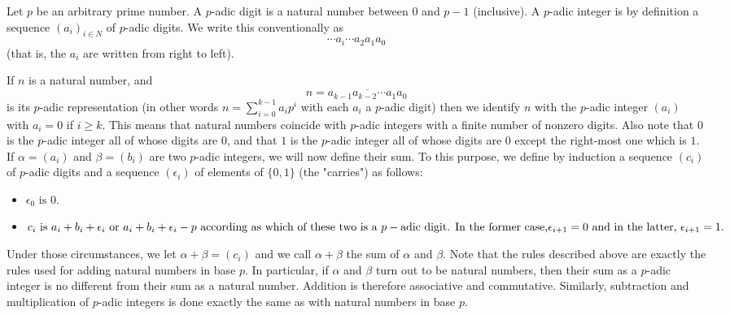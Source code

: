 \documentclass{llncs}
\begin{document}
Let $p$ be an arbitrary prime number. A $p$-adic digit is a natural number between $0$ and $p-1$ (inclusive). A $p$-adic integer is by definition a sequence $(a_i)_{i \in N}$ of $p$-adic digits. We write this conventionally as
$$
\cdots a_i \cdots  a_2 a_1 a_0
$$
(that is, the $a_i$ are written from right to left).

If $n$ is a natural number, and
$$
n = \overline{a_{k-1} a_{k-2} \cdots  a_1 a_0}
$$
is its $p$-adic representation (in other words $n = \sum ^{k-1}_{i=0}  a_ip^i$ with each $a_i$ a $p$-adic digit) then we identify $n$ with the $p$-adic integer $(a_i)$ with $a_i = 0$ if $i \geq k$. This means that natural numbers coincide with $p$-adic integers with a finite number of nonzero digits. Also note that $0$ is the $p$-adic integer all of whose digits are $0$, and that $1$ is the $p$-adic integer all of whose digits are $0$ except the right-most one which is $1$.
If $\alpha  = (a_i)$ and $\beta = (b_i)$ are two $p$-adic integers, we will now define their sum. To this purpose, we define by induction a sequence $(c_i)$ of $p$-adic digits and a sequence $(\epsilon _i)$ of elements of $\{0, 1\}$ (the "carries") as follows:


\begin{itemize}
  \item  $\epsilon _0 \mbox{ is } 0.$\\
  \item  $c_i \mbox{ is } a_i + b_i + \epsilon _i \mbox{ or } a_i + b_i + \epsilon _i - p \mbox{ according as which of these two is a }\\
p-\mbox{adic digit. In the former case,}\\
\epsilon _{i+1} = 0 \mbox{ and in the latter, } \epsilon _{i+1} = 1.$
\end{itemize}


Under those circumstances, we let $\alpha + \beta = (c_i)$ and we call $\alpha + \beta $ the sum of $\alpha $ and $\beta $. Note that the rules described above are exactly the rules used for adding natural numbers in base $p$. In particular, if $\alpha $ and $\beta $ turn out to be natural numbers, then their sum as a $p$-adic integer is no different from their sum as a natural number. Addition is therefore associative and commutative.
Similarly, subtraction and multiplication of $p$-adic integers is done exactly the same as with natural numbers in base $p$.
\end{document}
